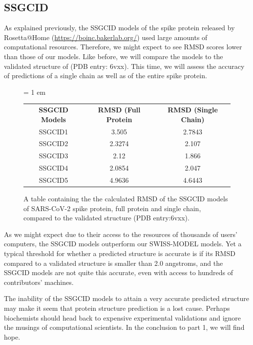 {{\begin{qbox}\end{qbox}

\FloatBarrier
{}
\subsection{SSGCID}

As explained previously, the SSGCID models of the spike protein released by Rosetta@Home (\url{https://boinc.bakerlab.org/}) used large amounts of computational resources. Therefore, we might expect to see RMSD scores lower than those of our models. Like before, we will compare the models to the validated structure of (PDB entry: 6vxx). This time, we will assess the accuracy of predictions of a single chain as well as of the entire spike protein.

\begin{figure}[h]
\centering
\tabcolsep = 1 em
\mySfFamily
\begin{tabular}{c c c}
\textbf{SSGCID Models} & \textbf{RMSD (Full Protein} & \textbf{RMSD (Single Chain)} \\
SSGCID1  & 3.505 & 2.7843 \\
SSGCID2  & 2.3274 & 2.107 \\
SSGCID3  & 2.12 & 1.866 \\
SSGCID4  & 2.0854 & 2.047 \\
SSGCID5  & 4.9636 & 4.6443 \\
\end{tabular}
\caption{A table containing the the calculated RMSD of the SSGCID models of SARS-CoV-2 spike protein, full protein and single chain, compared to the validated structure (PDB entry:6vxx).}
\label{fig:ssgcid_rmsd_table}
\end{figure}

As we might expect due to their access to the resources of thousands of users' computers, the SSGCID models outperform our SWISS-MODEL models. Yet a typical threshold for whether a predicted structure is accurate is if its RMSD compared to a validated structure is smaller than 2.0 angstroms, and the SSGCID models are not quite this accurate, even with access to hundreds of contributors' machines.

The inability of the SSGCID models to attain a very accurate predicted structure may make it seem that protein structure prediction is a lost cause. Perhaps biochemists should head back to expensive experimental validations and ignore the musings of computational scientists. In the conclusion to part 1, we will find hope.

}}
